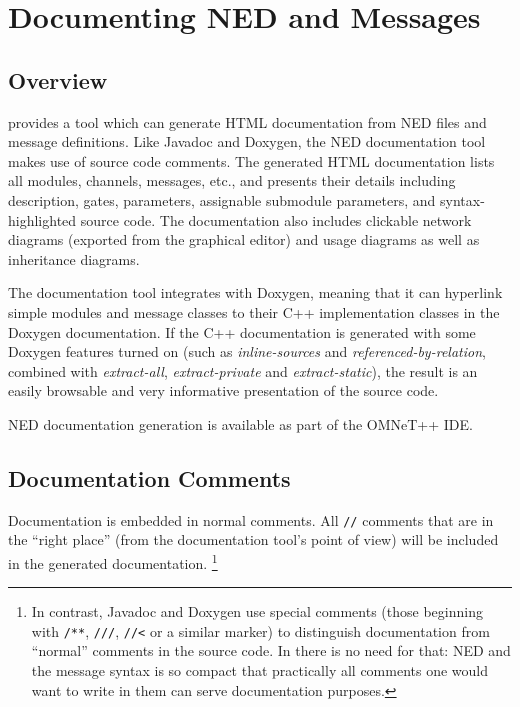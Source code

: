 \chapter{Documenting NED and Messages}
\label{cha:neddoc}

\section{Overview}
\label{sec:neddoc:overview}

{\opp} provides a tool which can generate HTML documentation from NED files
and message definitions. Like Javadoc and Doxygen, the NED documentation tool
makes use of source code comments. The generated HTML documentation
lists all modules, channels, messages, etc., and presents their details including
description, gates, parameters, assignable submodule parameters, and
syntax-highlighted source code. The documentation also includes clickable
network diagrams (exported from the graphical editor) and usage diagrams as
well as inheritance diagrams.

The documentation tool integrates with Doxygen, meaning that it can
hyperlink simple modules and message classes to their C++ implementation
classes in the Doxygen documentation. If the C++ documentation is generated
with some Doxygen features turned on (such as \textit{inline-sources} and
\textit{referenced-by-relation}, combined with \textit{extract-all},
\textit{extract-private} and \textit{extract-static}), the result is an
easily browsable and very informative presentation of the source code.

NED documentation generation is available as part of the OMNeT++ IDE.


\section{Documentation Comments}
\label{sec:neddoc:documentation-comments}

Documentation is embedded in normal comments. All \texttt{//} comments
that are in the ``right place'' (from the documentation tool's
point of view) will be included in the generated documentation.
  \footnote{In contrast, Javadoc and Doxygen use special comments (those
     beginning with \texttt{/**}, \texttt{///}, \texttt{//<} or a similar
     marker) to distinguish documentation from ``normal'' comments in the
     source code. In {\opp} there is no need for that: NED and the message
     syntax is so compact that practically all comments one would want to write
     in them can serve documentation purposes.}


